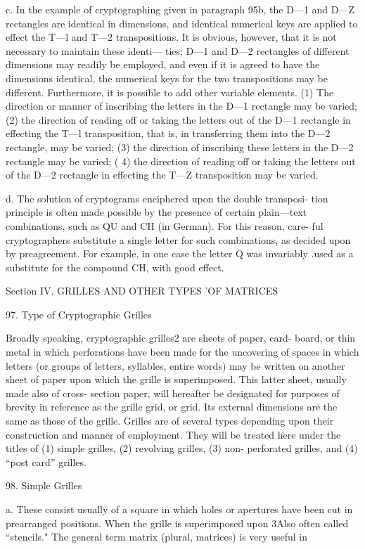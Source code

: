 c. In the example of cryptographing given in paragraph 95b, the
D—1 and D—Z rectangles are identical in dimensions, and identical
numerical keys are applied to effect the T—l and T—2 transpositions.
It is obvious, however, that it is not necessary to maintain these identi—
ties; D—1 and D—2 rectangles of different dimensions may readily be
employed, and even if it is agreed to have the dimensions identical, the
numerical keys for the two transpositions may be different. Furthermore,
it is possible to add other variable elements. (1) The direction or manner
of inscribing the letters in the D—1 rectangle may be varied; (2) the
direction of reading off or taking the letters out of the D—1 rectangle
in effecting the T—l transposition, that is, in transferring them into the
D—2 rectangle, may be varied; (3) the direction of inscribing these
letters in the D—2 rectangle may be varied; ( 4) the direction of reading
off or taking the letters out of the D—2 rectangle in effecting the T—Z
transposition may be varied.

d. The solution of cryptograms enciphered upon the double transposi-
tion principle is often made possible by the presence of certain plain—text
combinations, such as QU and CH (in German). For this reason, care-
ful cryptographers substitute a single letter for such combinations, as
decided upon by preagreement. For example, in one case the letter Q
was invariably .used as a substitute for the compound CH, with good
effect.

Section IV. GRILLES AND OTHER TYPES 'OF MATRICES

97. Type of Cryptographic Grilles

Broadly speaking, cryptographic grilles2 are sheets of paper, card-
board, or thin metal in which perforations have been made for the
uncovering of spaces in which letters (or groups of letters, syllables,
entire words) may be written on another sheet of paper upon which the
grille is superimposed. This latter sheet, usually made also of cross-
section paper, will hereafter be designated for purposes of brevity in
reference as the grille grid, or grid. Its external dimensions are the
same as those of the grille. Grilles are of several types depending upon
their construction and manner of employment. They will be treated here
under the titles of (1) simple grilles, (2) revolving grilles, (3) non-
perforated grilles, and (4) “post card” grilles.

98. Simple Grilles

a. These consist usually of a square in which holes or apertures have
been cut in prearranged positions. When the grille is superimposed upon
3Also often called “stencils." The general term matrix (plural, matrices) is very useful in

